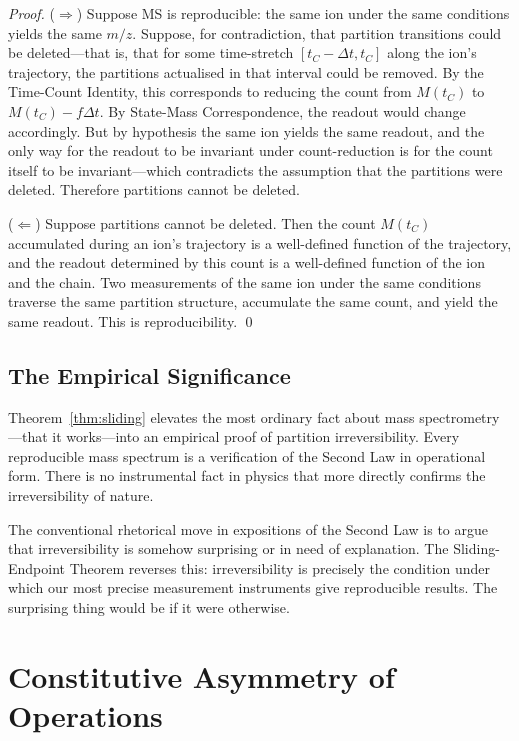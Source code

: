 \documentclass[twocolumn,10pt,a4paper]{article}
\theoremstyle{definition}
\theoremstyle{remark}
\newcommand{\Mcount}{M}
\begin{document}
\begin{proof}
($\Rightarrow$) Suppose MS is reproducible: the same ion under the same conditions yields the same $m/z$. Suppose, for contradiction, that partition transitions could be deleted---that is, that for some time-stretch $[t_C - \Delta t, t_C]$ along the ion's trajectory, the partitions actualised in that interval could be removed. By the Time-Count Identity, this corresponds to reducing the count from $\Mcount(t_C)$ to $\Mcount(t_C) - f\Delta t$. By State-Mass Correspondence, the readout would change accordingly. But by hypothesis the same ion yields the same readout, and the only way for the readout to be invariant under count-reduction is for the count itself to be invariant---which contradicts the assumption that the partitions were deleted. Therefore partitions cannot be deleted.

($\Leftarrow$) Suppose partitions cannot be deleted. Then the count $\Mcount(t_C)$ accumulated during an ion's trajectory is a well-defined function of the trajectory, and the readout determined by this count is a well-defined function of the ion and the chain. Two measurements of the same ion under the same conditions traverse the same partition structure, accumulate the same count, and yield the same readout. This is reproducibility. \qed
\end{proof}

\subsection{The Empirical Significance}

Theorem~\ref{thm:sliding} elevates the most ordinary fact about mass spectrometry---that it works---into an empirical proof of partition irreversibility. Every reproducible mass spectrum is a verification of the Second Law in operational form. There is no instrumental fact in physics that more directly confirms the irreversibility of nature.

The conventional rhetorical move in expositions of the Second Law is to argue that irreversibility is somehow surprising or in need of explanation. The Sliding-Endpoint Theorem reverses this: irreversibility is precisely the condition under which our most precise measurement instruments give reproducible results. The surprising thing would be if it were otherwise.

\section{Constitutive Asymmetry of Operations}
\label{sec:constitutive}
\end{document}
